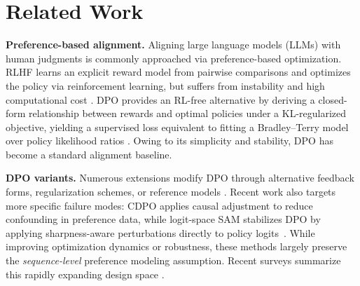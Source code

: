 \documentclass{article}
\theoremstyle{plain}
\theoremstyle{definition}
\theoremstyle{remark}
\begin{document}
\section{Related Work}

\textbf{Preference-based alignment.}
Aligning large language models (LLMs) with human judgments is commonly approached via preference-based optimization.
RLHF learns an explicit reward model from pairwise comparisons and optimizes the policy via reinforcement learning, but suffers from instability and high computational cost \citep{christiano2017deep,ouyang2022training}.
DPO provides an RL-free alternative by deriving a closed-form relationship between rewards and optimal policies under a KL-regularized objective, yielding a supervised loss equivalent to fitting a Bradley--Terry model over policy likelihood ratios \citep{rafailov2023dpo}.
Owing to its simplicity and stability, DPO has become a standard alignment baseline.

\textbf{DPO variants.}
Numerous extensions modify DPO through alternative feedback forms, regularization schemes, or reference models \citep{azar2023ipo,ethayarajh2024kto,xu2023cp,hong2024orpo,meng2024simpo, beta-dpo}.
Recent work also targets more specific failure modes: CDPO applies causal adjustment to reduce confounding in preference data, while logit-space SAM stabilizes DPO by applying sharpness-aware perturbations directly to policy logits~\citep{le2026causal,luo2026logitssam}.
While improving optimization dynamics or robustness, these methods largely preserve the \emph{sequence-level} preference modeling assumption.
Recent surveys summarize this rapidly expanding design space \citep{xiao2024survey,liu2024survey}.
\end{document}
